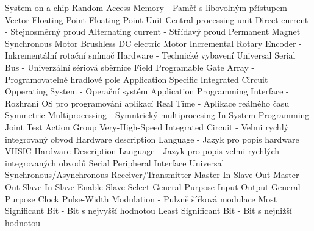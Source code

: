  {System on a chip}
 {Random Access Memory - Paměť s libovolným přístupem}
 {Vector Floating-Point}
 {Floating-Point Unit}
 {Central processing unit}
 {Direct current - Stejnosměrný proud}
 {Alternating current - Střídavý proud}
 {Permanent Magnet Synchronous Motor}
 {Brushless DC electric Motor}
 {Incremental Rotary Encoder - Inkrementální rotační snímač}
 {Hardware - Technické vybavení}
 {Universal Serial Bus - Univerzální sériová sběrnice}
 {Field Programable Gate Array - Programovatelné hradlové pole}
 {Application Specific Integrated Circuit}
 {Opperating System - Operační systém}
 {Application Programming Interface - Rozhraní OS pro programování aplikací}
 {Real Time - Aplikace reálného času}
 {Symmetric Multiprocessing - Symntrický multiprocesing}
 {In System Programming}
 {Joint Test Action Group}
 {Very-High-Speed Integrated Circuit - Velmi rychlý integrovaný obvod}
 {Hardware description Language - Jazyk pro popis hardware}
 {VHSIC Hardware Description Language - Jazyk pro popis velmi rychlých integrovaných obvodů}
 {Serial Peripheral Interface}
 {Universal Synchronous/Asynchronous Receiver/Transmitter}
 {Master In Slave Out}
 {Master Out Slave In}
 {Slave Enable}
 {Slave Select}
 {General Purpose Input Output}
 {General Purpose Clock}
 {Pulse-Width Modulation - Pulzně šířková modulace}
 {Most Significant Bit - Bit s nejvyšší hodnotou}
 {Least Significant Bit - Bit s nejnižší hodnotou}